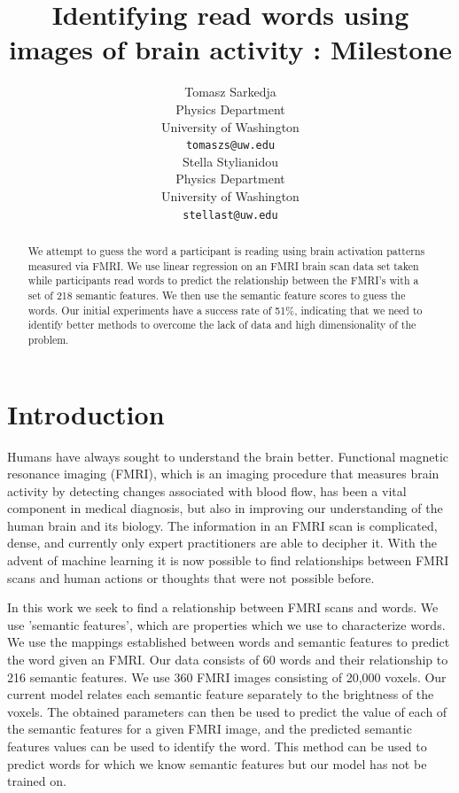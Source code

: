 \documentclass{article} %
\title{Identifying read words using images of brain activity : Milestone}
\author{
Tomasz Sarkedja \\
Physics Department\\
University of Washington\\
\texttt{tomaszs@uw.edu} \\
\And
Stella Stylianidou \\
Physics Department\\
University of Washington\\
\texttt{stellast@uw.edu} \\
}
\begin{document}
\maketitle

\begin{abstract}
We attempt to guess the word a participant is reading using brain activation patterns measured via FMRI. We use linear regression on an FMRI brain scan data set taken while participants read words to predict the relationship between the FMRI's with a set of 218 semantic features. We then use the semantic feature scores to guess the words. Our initial experiments have a success rate of 51\%, indicating that we need to identify better methods to overcome the lack of data and high dimensionality of the problem. 

\end{abstract}

\section{Introduction}

Humans have always sought to understand the brain better. Functional magnetic resonance imaging (FMRI), which is an imaging procedure that measures brain activity by detecting changes associated with blood flow, has been a vital component in medical diagnosis, but also in improving our understanding of the human brain and its biology. The information in an FMRI scan is complicated, dense, and currently only expert practitioners are able to decipher it. With the advent of machine learning it is now possible to find relationships between FMRI scans and human actions or thoughts that were not possible before.

In this work we seek to find a relationship between FMRI scans and words. We use 'semantic features', which are properties which we use to characterize words. We use the mappings established between words and semantic features to predict the word given an FMRI. Our data consists of 60 words and their relationship to 216 semantic features. We use 360 FMRI images consisting of 20,000 voxels. Our current model relates each semantic feature separately to the brightness of the voxels. The obtained parameters can then be used to predict the value of each of the semantic features for a given FMRI image, and the predicted semantic features values can be used to identify the word. This method can be used to predict words for which we know semantic features but our model has not be trained on.
\end{document}

